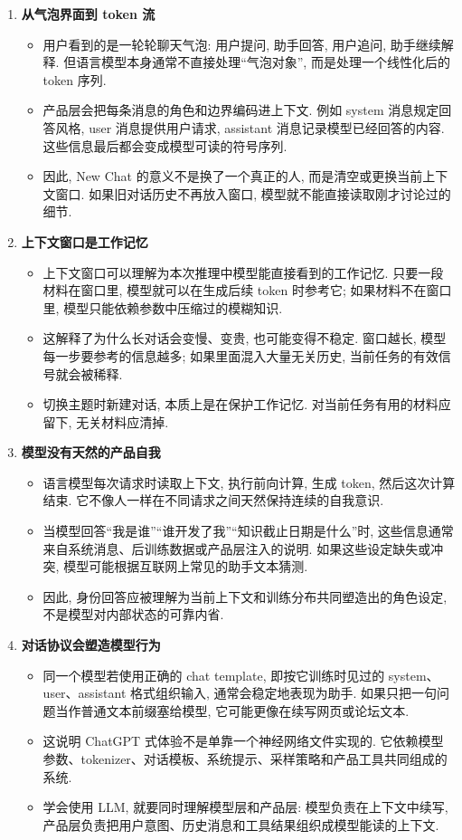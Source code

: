 \documentclass{../nndlcourse}
\begin{document}
\begin{enumerate}
  \item \textbf{从气泡界面到 token 流}
    \begin{itemize}
      \item 用户看到的是一轮轮聊天气泡: 用户提问, 助手回答, 用户追问, 助手继续解释. 但语言模型本身通常不直接处理“气泡对象”, 而是处理一个线性化后的 token 序列.
      \item 产品层会把每条消息的角色和边界编码进上下文. 例如 system 消息规定回答风格, user 消息提供用户请求, assistant 消息记录模型已经回答的内容. 这些信息最后都会变成模型可读的符号序列.
      \item 因此, New Chat 的意义不是换了一个真正的人, 而是清空或更换当前上下文窗口. 如果旧对话历史不再放入窗口, 模型就不能直接读取刚才讨论过的细节.
    \end{itemize}
  \item \textbf{上下文窗口是工作记忆}
    \begin{itemize}
      \item 上下文窗口可以理解为本次推理中模型能直接看到的工作记忆. 只要一段材料在窗口里, 模型就可以在生成后续 token 时参考它; 如果材料不在窗口里, 模型只能依赖参数中压缩过的模糊知识.
      \item 这解释了为什么长对话会变慢、变贵, 也可能变得不稳定. 窗口越长, 模型每一步要参考的信息越多; 如果里面混入大量无关历史, 当前任务的有效信号就会被稀释.
      \item 切换主题时新建对话, 本质上是在保护工作记忆. 对当前任务有用的材料应留下, 无关材料应清掉.
    \end{itemize}
  \item \textbf{模型没有天然的产品自我}
    \begin{itemize}
      \item 语言模型每次请求时读取上下文, 执行前向计算, 生成 token, 然后这次计算结束. 它不像人一样在不同请求之间天然保持连续的自我意识.
      \item 当模型回答“我是谁”“谁开发了我”“知识截止日期是什么”时, 这些信息通常来自系统消息、后训练数据或产品层注入的说明. 如果这些设定缺失或冲突, 模型可能根据互联网上常见的助手文本猜测.
      \item 因此, 身份回答应被理解为当前上下文和训练分布共同塑造出的角色设定, 不是模型对内部状态的可靠内省.
    \end{itemize}
  \item \textbf{对话协议会塑造模型行为}
    \begin{itemize}
      \item 同一个模型若使用正确的 chat template, 即按它训练时见过的 system、user、assistant 格式组织输入, 通常会稳定地表现为助手. 如果只把一句问题当作普通文本前缀塞给模型, 它可能更像在续写网页或论坛文本.
      \item 这说明 ChatGPT 式体验不是单靠一个神经网络文件实现的. 它依赖模型参数、tokenizer、对话模板、系统提示、采样策略和产品工具共同组成的系统.
      \item 学会使用 LLM, 就要同时理解模型层和产品层: 模型负责在上下文中续写, 产品层负责把用户意图、历史消息和工具结果组织成模型能读的上下文.
    \end{itemize}
\end{enumerate}
\end{document}
